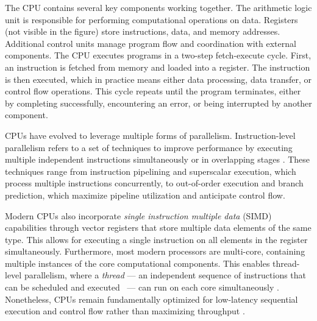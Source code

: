 \documentclass[english,12pt,a4paper,pdftex,sci,utf8]{aaltothesis}
\begin{document}
The CPU contains several key components working together. The arithmetic logic unit is responsible for performing computational operations on data. Registers (not visible in the figure) store instructions, data, and memory addresses. Additional control units manage program flow and coordination with external components. The CPU executes programs in a two-step fetch-execute cycle. First, an instruction is fetched from memory and loaded into a register. The instruction is then executed, which in practice means either data processing, data transfer, or control flow operations. This cycle repeats until the program terminates, either by completing successfully, encountering an error, or being interrupted by another component.

CPUs have evolved to leverage multiple forms of parallelism. Instruction-level parallelism refers to a set of techniques to improve performance by executing multiple independent instructions simultaneously or in overlapping stages \cite{hennessy2011computer, suomela_ppc}. These techniques range from instruction pipelining and superscalar execution, which process multiple instructions concurrently, to out-of-order execution and branch prediction, which maximize pipeline utilization and anticipate control flow.

Modern CPUs also incorporate \emph{single instruction multiple data} (SIMD) capabilities through vector registers that store multiple data elements of the same type. This allows for executing a single instruction on all elements in the register simultaneously. Furthermore, most modern processors are multi-core, containing multiple instances of the core computational components. This enables thread-level parallelism, where a \emph{thread} --- an independent sequence of instructions that can be scheduled and \mbox{executed \cite{stallings2011operating}} --- can run on each core simultaneously \cite{hennessy2011computer, suomela_ppc}. Nonetheless, CPUs remain fundamentally optimized for low-latency sequential execution and control flow rather than maximizing throughput \cite{hennessy2011computer, suomela_ppc}.
\end{document}
